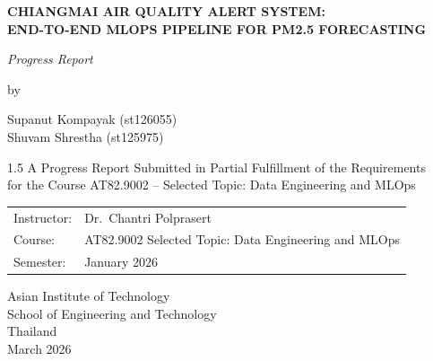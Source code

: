\documentclass[12pt,a4paper]{report}
\begin{document}


\begin{titlepage}
\begin{center}
\vspace*{1.5cm}

{\large\bfseries CHIANGMAI AIR QUALITY ALERT SYSTEM: \\[0.4em]
END-TO-END MLOPS PIPELINE FOR PM2.5 FORECASTING}

\vspace{1.0cm}

{\normalsize\itshape Progress Report}

\vspace{1.8cm}

by

\vspace{1.2cm}

{\normalsize
Supanut Kompayak (st126055) \\[0.4em]
Shuvam Shrestha (st125975)
}

\vspace{2.2cm}

\begin{spacing}{1.5}
{\normalsize
A Progress Report Submitted in Partial Fulfillment of the Requirements \\
for the Course AT82.9002 -- Selected Topic: Data Engineering and MLOps
}
\end{spacing}

\vspace{1.5cm}

\begin{tabular}{ll}
  Instructor:   & Dr.\ Chantri Polprasert \\[0.4em]
  Course:       & AT82.9002 Selected Topic: Data Engineering and MLOps \\[0.4em]
  Semester:     & January 2026 \\
\end{tabular}

\vfill

Asian Institute of Technology \\
School of Engineering and Technology \\
Thailand \\[0.4em]
March 2026

\end{center}
\end{titlepage}
\end{document}
